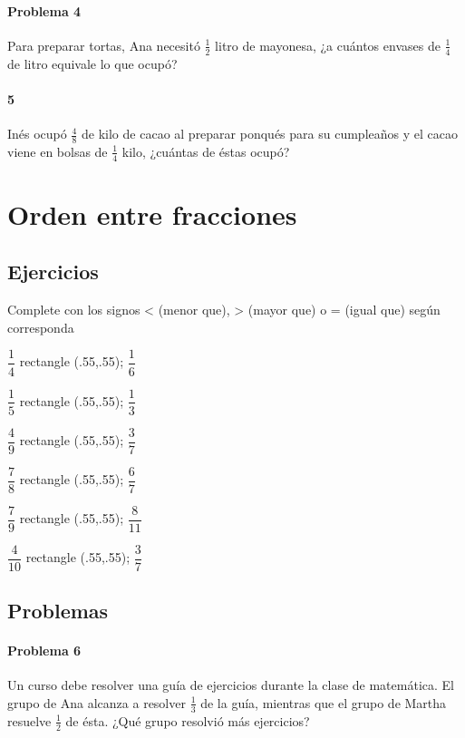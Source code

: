 \documentclass[10pt,twoside]{article}
\begin{document}
\paragraph*{Problema 4}
Para preparar tortas, Ana necesitó $\frac{1}{2}$ litro de mayonesa, ¿a cuántos envases de $\frac{1}{4}$ de litro equivale lo que ocup\'{o}?
\paragraph*{5}
Inés ocupó $\frac{4}{8}$ de kilo de cacao al preparar ponqués para su cumpleaños y el cacao viene en bolsas de $\frac{1}{4}$ kilo, ¿cuántas de éstas ocupó?
\section*{Orden entre fracciones}
\subsection*{Ejercicios}
Complete con los signos < (menor que), > (mayor que) o = (igual que) según corresponda
\begin{itemize}
\begin{multicols}{3}
\item $\dfrac{1}{4}$ \tikz \draw rectangle (.55,.55); $\dfrac{1}{6}$
\item $\dfrac{1}{5}$ \tikz \draw rectangle (.55,.55); $\dfrac{1}{3}$
\item $\dfrac{4}{9}$ \tikz \draw rectangle (.55,.55); $\dfrac{3}{7}$
\item $\dfrac{7}{8}$ \tikz \draw rectangle (.55,.55); $\dfrac{6}{7}$
\item $\dfrac{7}{9}$ \tikz \draw rectangle (.55,.55); $\dfrac{8}{11}$ 
\item $\dfrac{4}{10}$ \tikz \draw rectangle (.55,.55); $\dfrac{3}{7}$
\end{multicols}
\end{itemize}
\subsection*{Problemas}
\paragraph*{Problema 6}
Un curso debe resolver una gu\'{i}a de ejercicios durante la clase de matem\'{a}tica. El grupo de Ana alcanza a resolver $\frac{1}{3}$ de la gu\'{i}a, mientras que el grupo de Martha resuelve $\frac{1}{2}$ de \'{e}sta. ¿Qu\'{e} grupo resolvi\'{o} m\'{a}s ejercicios?
\end{document}
